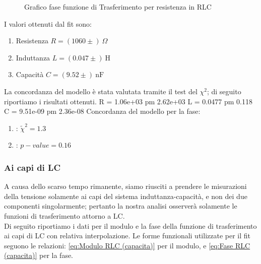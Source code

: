 \documentclass[letterpaper,12pt]{article}
\begin{document}
\begin{figure}[h!]
    \centering
    \caption{Grafico fase funzione di Trasferimento per resistenza in RLC}
    \label{fig:RLC_R_fase}
\end{figure}

I valori ottenuti dal fit sono:
\begin{enumerate}
    \item Resistenza  $R = (1060\pm %
    )\ \Omega $
    \item Induttanza  $L = (0.047\pm)\ \text{H} $
    \item Capacità    $C = (9.52\pm)\ \text{nF} $
\end{enumerate}
La concordanza del modello è stata valutata tramite il test del $\chi^2$; di seguito riportiamo i risultati ottenuti.
R = 1.06e+03 pm 2.62e+03
L = 0.0477 pm 0.118
C = 9.51e-09 pm 2.36e-08
Concordanza del modello per la fase:
\begin{enumerate} 
    \item: $\widetilde{\chi}^2 = 1.3$   
    \item: $p-value = 0.16$ 
\end{enumerate}

\subsubsection{Ai capi di LC}
A causa dello scarso tempo rimanente, siamo riusciti a prendere le misurazioni della tensione solamente ai capi del sistema induttanza-capacità, e non dei due componenti singolarmente; pertanto la nostra analisi osserverà solamente le funzioni di trasferimento attorno a LC. \\
Di seguito riportiamo i dati per il modulo e la fase della funzione di trasferimento ai capi di LC con relativa interpolazione. Le forme funzionali utilizzate per il fit seguono le relazioni: \eqref{eq:Modulo RLC (capacita)}  per il modulo, e \eqref{eq:Fase RLC (capacita)} per la fase.
\end{document}
